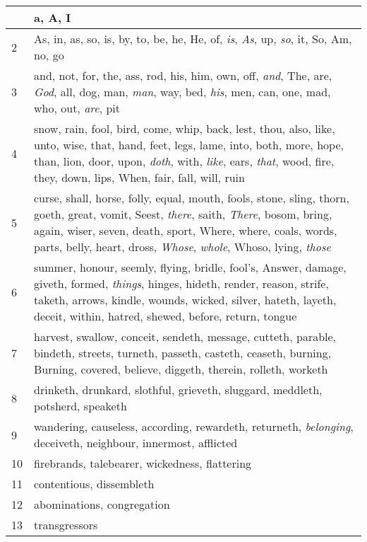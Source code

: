 \begin{center}
\begin{longtable}{l|p{3.75in}}
\hline \hline 
\endlastfoot 
1 & a, A, I\\ \hline 
2 & As, in, as, so, is, by, to, be, he, He, of, \emph{is}, \emph{As}, up, \emph{so}, it, So, Am, no, go\\ \hline 
3 & and, not, for, the, ass, rod, his, him, own, off, \emph{and}, The, are, \emph{God}, all, dog, man, \emph{man}, way, bed, \emph{his}, men, can, one, mad, who, out, \emph{are}, pit\\ \hline 
4 & snow, rain, fool, bird, come, whip, back, lest, thou, also, like, unto, wise, that, hand, feet, legs, lame, into, both, more, hope, than, lion, door, upon, \emph{doth}, with, \emph{like}, ears, \emph{that}, wood, fire, they, down, lips, When, fair, fall, will, ruin\\ \hline 
5 & curse, shall, horse, folly, equal, mouth, fools, stone, sling, thorn, goeth, great, vomit, Seest, \emph{there}, saith, \emph{There}, bosom, bring, again, wiser, seven, death, sport, Where, where, coals, words, parts, belly, heart, dross, \emph{Whose}, \emph{whole}, Whoso, lying, \emph{those}\\ \hline 
6 & summer, honour, seemly, flying, bridle, fool's, Answer, damage, giveth, formed, \emph{things}, hinges, hideth, render, reason, strife, taketh, arrows, kindle, wounds, wicked, silver, hateth, layeth, deceit, within, hatred, shewed, before, return, tongue\\ \hline 
7 & harvest, swallow, conceit, sendeth, message, cutteth, parable, bindeth, streets, turneth, passeth, casteth, ceaseth, burning, Burning, covered, believe, diggeth, therein, rolleth, worketh\\ \hline 
8 & drinketh, drunkard, slothful, grieveth, sluggard, meddleth, potsherd, speaketh\\ \hline 
9 & wandering, causeless, according, rewardeth, returneth, \emph{belonging}, deceiveth, neighbour, innermost, afflicted\\ \hline 
10 & firebrands, talebearer, wickedness, flattering\\ \hline 
11 & contentious, dissembleth\\ \hline 
12 & abominations, congregation\\ \hline 
13 & transgressors\\ \hline 
\end{longtable} 
\end{center} 




 
